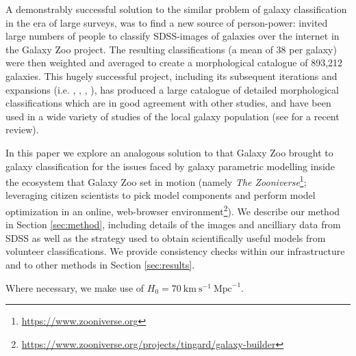 \documentclass[../main.tex]{subfiles}
\begin{document}
A demonstrably successful solution to the similar problem of galaxy classification in the era of large surveys, was to find a new source of person-power: \cite{Lintott2008:0804.4483v1} invited large numbers of people to classify SDSS-images of galaxies over the internet in the Galaxy Zoo project. The resulting classifications (a mean of 38 per galaxy) were then weighted and averaged to create a morphological catalogue of 893,212 galaxies. This hugely successful project, including its subsequent iterations and expansions (i.e. \citealt{Willett2013:1308.3496v2}, \citealt{2017MNRAS.464.4176W}, \citealt{2017MNRAS.464.4420S}, \citealt{Hart2016:1607.01019v1}), has produced a large catalogue of detailed morphological classifications which are in good agreement with other studies, and have been used in a wide variety of studies of the local galaxy population (see \citealt{2019AAS...23333201M} for a recent review).

In this paper we explore an analogous solution to that Galaxy Zoo brought to galaxy classification \citep{Lintott2008:0804.4483v1} for the issues faced by galaxy parametric modelling inside the ecosystem that Galaxy Zoo set in motion (namely {\it The Zooniverse}\footnote{\url{https://www.zooniverse.org}}; leveraging citizen scientists to pick model components and perform model optimization in an online, web-browser environment\footnote{\url{https://www.zooniverse.org/projects/tingard/galaxy-builder}}). We describe our method in Section \ref{sec:method}, including details of the images and ancilliary data from SDSS as well as the strategy used to obtain scientifically useful models from volunteer classifications. We provide consistency checks within our infrastructure and to other methods in Section \ref{sec:results}.

Where necessary, we make use of $H_0 = 70\ \text{km}\ \text{s}^{-1}\ \text{Mpc}^{-1}$.
\end{document}
